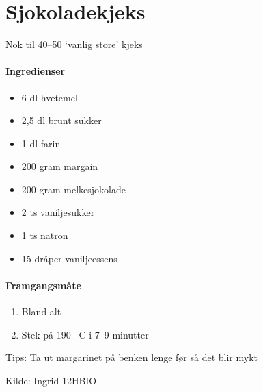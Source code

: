 \section{﻿Sjokoladekjeks}
Nok til 40--50 `vanlig store' kjeks

\paragraph{Ingredienser}
\begin{itemize}[noitemsep]
  \item 6 dl hvetemel
  \item 2,5 dl brunt sukker
  \item 1 dl farin
  \item 200 gram margain
  \item 200 gram melkesjokolade
  \item 2 ts vaniljesukker
  \item 1 ts natron
  \item 15 dråper vaniljeessens
\end{itemize}

\paragraph{Framgangsmåte}
\begin{enumerate}[noitemsep]
  \item Bland alt
  \item Stek på 190 \degree~C i 7--9 minutter
\end{enumerate}

Tips: Ta ut margarinet på benken lenge før så det blir mykt

Kilde: Ingrid 12HBIO

